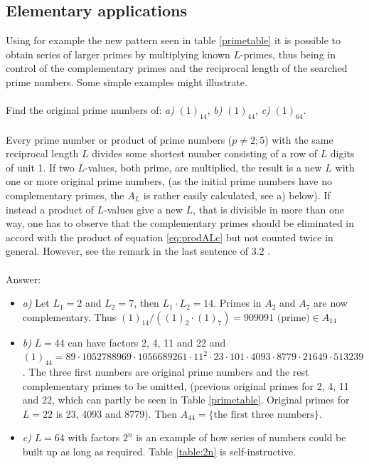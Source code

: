 \documentclass[10pt,twoside,a4paper]{amsart}
\begin{document}
\subsection{Elementary applications}

Using for example the new pattern seen in table \ref{primetable} it is possible to obtain series of larger primes by multiplying known $L$-primes, thus being in control of the complementary primes and the reciprocal length of the searched prime numbers. Some simple examples might illustrate.\\
\\
Find the original prime numbers of: \emph{a)} $(1)_{14}$, \emph{b)} $(1)_{44}$, \emph{c)} $(1)_{64}$.\\
\\
Every prime number or product of prime numbers ($p\neq 2;5$) with the same reciprocal length $L$ divides some shortest number consisting of a row of $L$ digits of unit 1. If two $L$-values, both prime, are multiplied, the result is a new $L$ with one or more original prime numbers, (as the initial prime numbers have no complementary primes, the $A_{L}$ is rather easily calculated, see a) below). If instead a product of $L$-values give a new $L$, that is divisible in more than one way, one has to observe that the complementary primes should be eliminated in accord with the product of equation \ref{eq:prodALc} but not counted twice in general. However, see the remark in the last sentence of 3.2 \cite{Book1}.\\
\\
Answer:
\begin{itemize}
\item[] \emph{a)} Let $L_{1} = 2$ and $L_{2} = 7$, then $L_{1} \cdot L_{2} = 14$. Primes in $A_{2}$ and $A_{7}$ are now complementary. Thus $(1)_{14}/((1)_{2}\cdot (1)_{7}) = 909091 \text{ (prime)} \in A_{14}$
\item[] \emph{b)} $L = 44$ can have factors 2, 4, 11 and 22 and $(1)_{44} = 89 \cdot 1052788969 \cdot 1056689261 \cdot 11^{2} \cdot 23 \cdot 101 \cdot 4093 \cdot 8779 \cdot 21649 \cdot 513239$. The three first numbers are original prime numbers and the rest complementary primes to be omitted, (previous original primes for 2, 4, 11 and 22, which can partly be seen in Table \ref{primetable}. Original primes for $L = 22$ is 23, 4093 and 8779). Then $A_{44} = \text{\{the first three numbers\}}$.
\item[] \emph{c)} $L = 64$ with factors $2^{n}$ is an example of how series of numbers could be built up as long as required. Table \ref{table:2n} is self-instructive.
\end{itemize}
\end{document}
